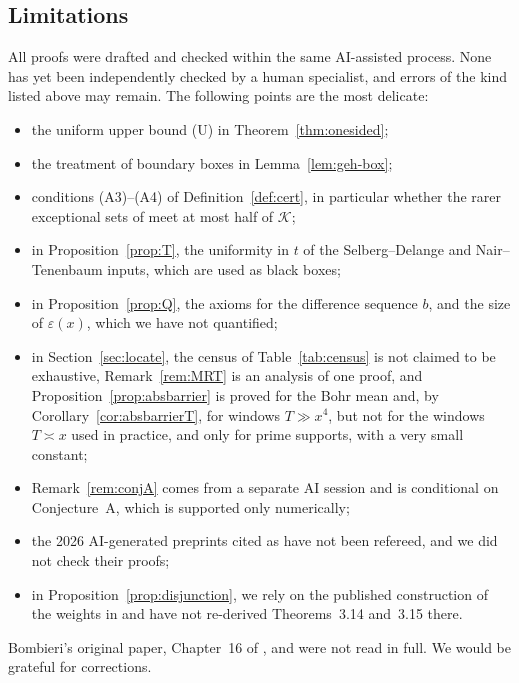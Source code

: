 \subsection{Limitations}
All proofs were drafted and checked within the same AI-assisted process. None has yet been independently checked by a human specialist, and errors of the kind listed above may remain. The following points are the most delicate:
\begin{itemize}
\item the uniform upper bound (U) in Theorem~\ref{thm:onesided};
\item the treatment of boundary boxes in Lemma~\ref{lem:geh-box};
\item conditions (A3)--(A4) of Definition~\ref{def:cert}, in particular whether the rarer exceptional sets of \cite{HR21,Pil23} meet at most half of $\mathcal K$;
\item in Proposition~\ref{prop:T}, the uniformity in $t$ of the Selberg--Delange and Nair--Tenenbaum inputs, which are used as black boxes;
\item in Proposition~\ref{prop:Q}, the axioms for the difference sequence $b$, and the size of $\varepsilon(x)$, which we have not quantified;
\item in Section~\ref{sec:locate}, the census of Table~\ref{tab:census} is not claimed to be exhaustive, Remark~\ref{rem:MRT} is an analysis of one proof, and Proposition~\ref{prop:absbarrier} is proved for the Bohr mean and, by Corollary~\ref{cor:absbarrierT}, for windows $T\gg x^4$, but not for the windows $T\asymp x$ used in practice, and only for prime supports, with a very small constant;
\item Remark~\ref{rem:conjA} comes from a separate AI session and is conditional on Conjecture~A, which is supported only numerically;
\item the 2026 AI-generated preprints cited as \cite{OpenAI26} have not been refereed, and we did not check their proofs;
\item in Proposition~\ref{prop:disjunction}, we rely on the published construction of the weights in \cite{Polymath8b} and have not re-derived Theorems~3.14 and~3.15 there.
\end{itemize}
Bombieri's original paper, Chapter~16 of \cite{FI10}, and \cite{MV17} were not read in full. We would be grateful for corrections.
